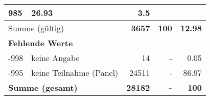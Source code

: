 \begin{longtable}{lXrrr}
       \num{985} &
       \num[round-mode=places,round-precision=2]{26,93} &
         \num[round-mode=places,round-precision=2]{3,5} \\
     \midrule
     \multicolumn{2}{l}{Summe (gültig)} &
       \textbf{\num{3657}} &
     \textbf{100} &
       \textbf{\num[round-mode=places,round-precision=2]{12,98}} \\
     \multicolumn{5}{l}{\textbf{Fehlende Werte}}\\
       -998 &
       keine Angabe &
         \num{14} &
        - &
         \num[round-mode=places,round-precision=2]{0,05} \\
       -995 &
       keine Teilnahme (Panel) &
         \num{24511} &
        - &
         \num[round-mode=places,round-precision=2]{86,97} \\
     \midrule
     \multicolumn{2}{l}{\textbf{Summe (gesamt)}} &
          \textbf{\num{28182}} &
        \textbf{-} &
        \textbf{100} \\
     \bottomrule
     \end{longtable}
     
